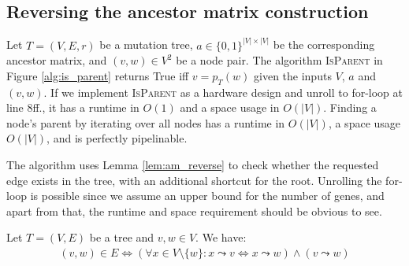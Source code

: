 \subsection{Reversing the ancestor matrix construction}

\begin{theorem}
    \label{theo:am_reverse}
    Let $T=(V, E, r)$ be a mutation tree, $a \in \{0, 1\}^{|V| \times |V|}$ be the corresponding ancestor matrix, and $(v, w) \in V^2$ be a node pair. The algorithm \textsc{IsParent} in Figure \ref{alg:is_parent} returns True iff $v = p_T(w)$ given the inputs $V$, $a$ and $(v,w)$. If we implement \textsc{IsParent} as a hardware design and unroll to for-loop at line 8ff., it has a runtime in $O(1)$ and a space usage in $O(|V|)$. Finding a node's parent by iterating over all nodes has a runtime in $O(|V|)$, a space usage $O(|V|)$, and is perfectly pipelinable.
\end{theorem}

The algorithm uses Lemma \ref{lem:am_reverse} to check whether the requested edge exists in the tree, with an additional shortcut for the root. Unrolling the for-loop is possible since we assume an upper bound for the number of genes, and apart from that, the runtime and space requirement should be obvious to see.

\begin{lemma}
    \label{lem:am_reverse}
    Let $T = (V, E)$ be a tree and $v, w \in V$. We have:
    \begin{align*}
        (v, w) \in E \Leftrightarrow (\forall x \in V \setminus \{w\}: x \leadsto v \Leftrightarrow x \leadsto w) \wedge (v \leadsto w)
    \end{align*}
\end{lemma}


